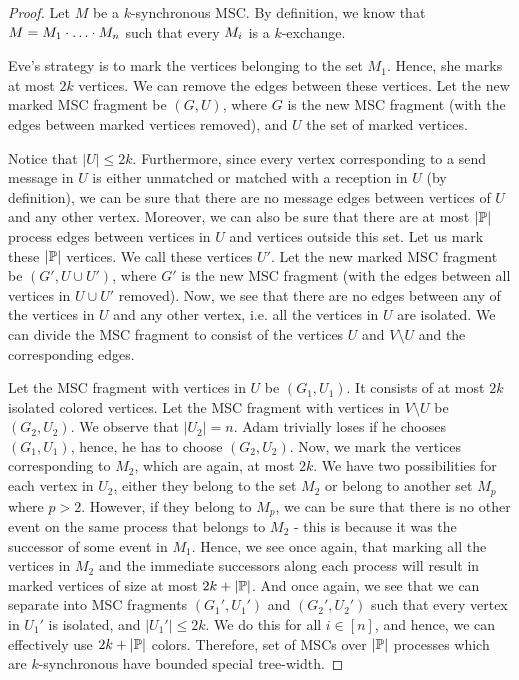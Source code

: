 \documentclass[a4paper,UKenglish,cleveref, autoref, thm-restate]{lipics-v2021}
\begin{document}
\begin{proof}
	Let $M$ be a $k$-synchronous MSC. By definition, we know that $M = M_1 \cdot \ldots \cdot M_n$
	such that every $M_i$ is a $k$-exchange.

	Eve's strategy is to mark the vertices belonging to the set $M_1$. Hence, she marks at most $2k$ vertices. We can remove the edges between these vertices. Let the new marked MSC fragment be $(G, U)$, where $G$ is the new MSC fragment (with the edges between marked vertices removed), and $U$ the set of marked vertices.

	Notice  that $|U| \leq 2k$. Furthermore, since every vertex corresponding to a send message in $U$ is either unmatched or matched with a reception in $U$ (by definition), we can be sure that there are no message edges between vertices of $U$ and any other vertex. Moreover, we can also be sure that there are at most $|\mathbb{P}|$ process edges between vertices in $U$ and vertices outside this set. Let us mark these $|\mathbb{P}|$ vertices. We call these vertices $U'$. Let the new marked MSC fragment be $(G', U \cup U')$, where $G'$ is the new MSC fragment (with the edges between all vertices in $U \cup U'$ removed). Now, we see that there are no edges between any of the vertices in $U$ and any other vertex, i.e. all the vertices in $U$ are isolated. We can  divide the MSC fragment to consist of the vertices $U$ and $V \setminus U$ and the corresponding edges.

	Let the MSC fragment with vertices in $U$ be $(G_1, U_1)$. It consists of at most $2k$ isolated colored vertices. Let the MSC fragment with vertices in $V \setminus U$ be $(G_2, U_2)$. We observe that $|U_2|=n$. Adam  trivially loses if he chooses $(G_1, U_1)$, hence, he has to choose $(G_2, U_2)$. Now, we mark the vertices corresponding to $M_2$, which are again, at most $2k$. We have two possibilities for each vertex in $U_2$, either they belong to the set $M_2$ or belong to another set $M_p$ where $p>2$. However, if they belong to $M_p$, we can be sure that there is no other event on the same process that belongs to $M_2$ - this is because it was the successor of some event in $M_1$. Hence, we see once again, that marking all the vertices in $M_2$ and the immediate successors along each process will result in marked vertices of size at most $2k + |\mathbb{P}|$. And once again, we see that we can separate into MSC fragments $(G_1', U_1')$ and $(G_2', U_2')$ such that every vertex in $U_1'$ is isolated, and $|U_1'| \leq 2k$. We do this for all $i \in [n]$, and hence, we can effectively use $2k +|\mathbb{P}|$ colors. Therefore, set of MSCs over $|\mathbb{P}|$ processes which are $k$-synchronous have bounded special tree-width.
\end{proof}
\end{document}
